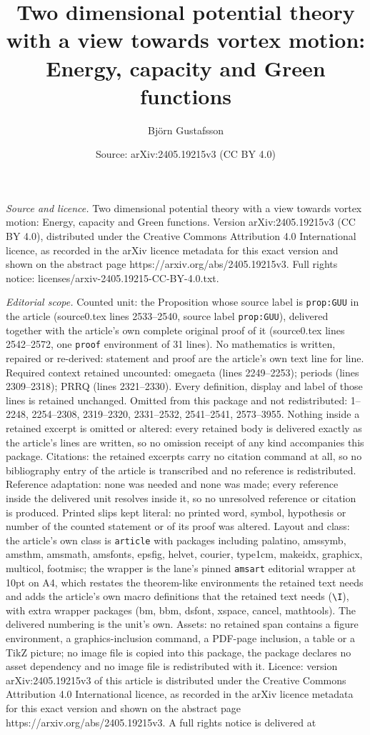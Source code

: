\documentclass[10pt,a4paper]{amsart}
\title[Two dimensional potential theory with a view towards vortex ]{Two dimensional potential theory with a view towards vortex motion: Energy, capacity and Green functions}
\author{Bj\"orn Gustafsson}
\date{Source: arXiv:2405.19215v3 (CC BY 4.0)}
\begin{document}
\maketitle

\noindent\emph{Source and licence.} Two dimensional potential theory with a view towards vortex motion: Energy, capacity and Green functions. Version arXiv:2405.19215v3 (CC BY 4.0), distributed under the Creative Commons Attribution 4.0 International licence, as recorded in the arXiv licence metadata for this exact version and shown on the abstract page https://arxiv.org/abs/2405.19215v3. Full rights notice: licenses/arxiv-2405.19215-CC-BY-4.0.txt.\par\smallskip

\noindent\textit{Editorial scope.} Counted unit: the Proposition whose source label is \texttt{prop:GUU} in the article (source0.tex lines 2533--2540, source label \texttt{prop:GUU}), delivered together with the article's own complete original proof of it (source0.tex lines 2542--2572, one \texttt{proof} environment of 31 lines). No mathematics is written, repaired or re-derived: statement and proof are the article's own text line for line. Required context retained uncounted: omegaeta (lines 2249--2253); periods (lines 2309--2318); PRRQ (lines 2321--2330). Every definition, display and label of those lines is retained unchanged. Omitted from this package and not redistributed: 1--2248, 2254--2308, 2319--2320, 2331--2532, 2541--2541, 2573--3955. Nothing inside a retained excerpt is omitted or altered: every retained body is delivered exactly as the article's lines are written, so no omission receipt of any kind accompanies this package. Citations: the retained excerpts carry no citation command at all, so no bibliography entry of the article is transcribed and no reference is redistributed. Reference adaptation: none was needed and none was made; every reference inside the delivered unit resolves inside it, so no unresolved reference or citation is produced. Printed slips kept literal: no printed word, symbol, hypothesis or number of the counted statement or of its proof was altered. Layout and class: the article's own class is \texttt{article} with packages including palatino, amssymb, amsthm, amsmath, amsfonts, epsfig, helvet, courier, type1cm, makeidx, graphicx, multicol, footmisc; the wrapper is the lane's pinned \texttt{amsart} editorial wrapper at 10pt on A4, which restates the theorem-like environments the retained text needs and adds the article's own macro definitions that the retained text needs (\texttt{\textbackslash I}), with extra wrapper packages (bm, bbm, dsfont, xspace, cancel, mathtools). The delivered numbering is the unit's own. Assets: no retained span contains a figure environment, a graphics-inclusion command, a PDF-page inclusion, a table or a TikZ picture; no image file is copied into this package, the package declares no asset dependency and no image file is redistributed with it. Licence: version arXiv:2405.19215v3 of this article is distributed under the Creative Commons Attribution 4.0 International licence, as recorded in the arXiv licence metadata for this exact version and shown on the abstract page https://arxiv.org/abs/2405.19215v3. A full rights notice is delivered at 
\end{document}
